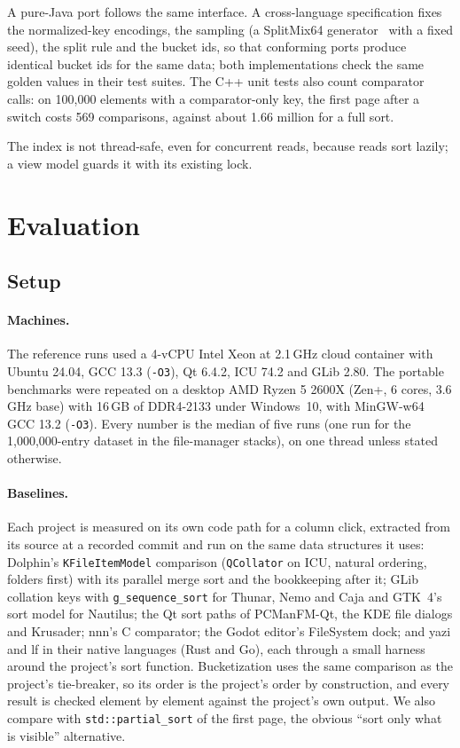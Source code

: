 \documentclass[11pt]{article}
\theoremstyle{definition}
\begin{document}
A pure-Java port follows the same interface. A cross-language specification
fixes the normalized-key encodings, the sampling (a SplitMix64
generator~\cite{steele2014splitmix} with a fixed seed), the split rule and the
bucket ids, so that conforming ports produce identical bucket ids for the same
data; both implementations check the same golden values in their test suites.
The C++ unit tests also count comparator calls: on 100{,}000 elements with a
comparator-only key, the first page after a switch costs 569 comparisons,
against about 1.66 million for a full sort.

The index is not thread-safe, even for concurrent reads, because reads sort
lazily; a view model guards it with its existing lock.

\section{Evaluation}\label{sec:eval}

\subsection{Setup}

\paragraph{Machines.} The reference runs used a 4-vCPU Intel Xeon at 2.1\,GHz
cloud container with Ubuntu 24.04, GCC 13.3 (\texttt{-O3}), Qt 6.4.2, ICU 74.2
and GLib 2.80. The portable benchmarks were repeated on a desktop AMD Ryzen 5
2600X (Zen+, 6 cores, 3.6\,GHz base) with 16\,GB of DDR4-2133 under Windows~10,
with MinGW-w64 GCC 13.2 (\texttt{-O3}). Every number is the median of five runs
(one run for the 1{,}000{,}000-entry dataset in the file-manager stacks), on one
thread unless stated otherwise.

\paragraph{Baselines.} Each project is measured on its own code path for a
column click, extracted from its source at a recorded commit and run on the
same data structures it uses: Dolphin's \texttt{KFileItemModel} comparison
(\texttt{QCollator} on ICU, natural ordering, folders first) with its parallel
merge sort and the bookkeeping after it; GLib collation keys with
\texttt{g\_sequence\_sort} for Thunar, Nemo and Caja and GTK~4's sort model for
Nautilus; the Qt sort paths of PCManFM-Qt, the KDE file dialogs and Krusader;
nnn's C comparator; the Godot editor's FileSystem dock; and yazi and lf in their
native languages (Rust and Go), each through a small harness around the
project's sort function. Bucketization uses the same comparison as the
project's tie-breaker, so its order is the project's order by construction,
and every result is checked element by element against the project's own
output. We also compare with \texttt{std::partial\_sort} of the first page,
the obvious ``sort only what is visible'' alternative.
\end{document}
